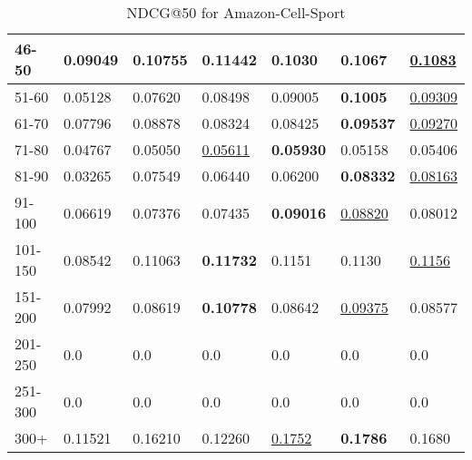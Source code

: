 \begin{table*}[]
\begin{tabular}{|l|l|l|l|l|l|l|}
    46-50   & 0.09049                        & 0.10755                        & \textbf{0.11442}               & 0.1030                         & 0.1067                         & \underline{0.1083}                         \\ \hline
    51-60   & 0.05128                        & 0.07620                        & 0.08498                        & 0.09005                        & \textbf{0.1005}                & \underline{0.09309}                        \\ \hline
    61-70   & 0.07796                        & 0.08878                        & 0.08324                        & 0.08425                        & \textbf{0.09537}               & \underline{0.09270}                        \\ \hline
    71-80   & 0.04767                        & 0.05050                        & \underline{0.05611}            & \textbf{0.05930}               & 0.05158                        & 0.05406                        \\ \hline
    81-90   & 0.03265                        & 0.07549                        & 0.06440                        & 0.06200                        & \textbf{0.08332}               & \underline{0.08163}                        \\ \hline
    91-100  & 0.06619                        & 0.07376                        & 0.07435                        & \textbf{0.09016}               & \underline{0.08820}                        & 0.08012                        \\ \hline
    101-150 & 0.08542                        & 0.11063                        & \textbf{0.11732}               & 0.1151                         & 0.1130                         & \underline{0.1156}                        \\ \hline
    151-200 & 0.07992                        & 0.08619                        & \textbf{0.10778}               & 0.08642                        & \underline{0.09375}                        & 0.08577                        \\ \hline
    201-250 & 0.0                            & 0.0                            & 0.0                            & 0.0                            & 0.0                            & 0.0                            \\ \hline
    251-300 & 0.0                            & 0.0                            & 0.0                            & 0.0                            & 0.0                            & 0.0                            \\ \hline
    300+    & 0.11521                        & 0.16210                        & 0.12260                        & \underline{0.1752}             & \textbf{0.1786}                & 0.1680                         \\ \hline
    \end{tabular}
    \caption{NDCG@50 for Amazon-Cell-Sport}
    \label{tab:Amazon-Cell-Sport-ndcg-evaluation}
\end{table*}
